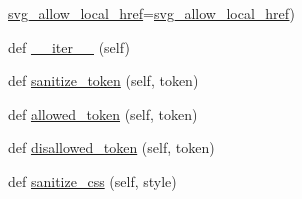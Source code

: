 \begin{DoxyCompactItemize}
\hyperlink{classpip_1_1__vendor_1_1html5lib_1_1filters_1_1sanitizer_1_1Filter_a6eb108defa9bd58d65167a6cf3edf502}{svg\+\_\+allow\+\_\+local\+\_\+href}=\hyperlink{classpip_1_1__vendor_1_1html5lib_1_1filters_1_1sanitizer_1_1Filter_a6eb108defa9bd58d65167a6cf3edf502}{svg\+\_\+allow\+\_\+local\+\_\+href})
\item 
def \hyperlink{classpip_1_1__vendor_1_1html5lib_1_1filters_1_1sanitizer_1_1Filter_a2c0ff9addc9b4172b0de3226dbeb8d71}{\+\_\+\+\_\+iter\+\_\+\+\_\+} (self)
\item 
def \hyperlink{classpip_1_1__vendor_1_1html5lib_1_1filters_1_1sanitizer_1_1Filter_a1a41f0a9620da0e675829d7beb0de620}{sanitize\+\_\+token} (self, token)
\item 
def \hyperlink{classpip_1_1__vendor_1_1html5lib_1_1filters_1_1sanitizer_1_1Filter_a0f06ab91d8402ca9f921020cffebc191}{allowed\+\_\+token} (self, token)
\item 
def \hyperlink{classpip_1_1__vendor_1_1html5lib_1_1filters_1_1sanitizer_1_1Filter_afc4f989311691eb2358c86961cb972b8}{disallowed\+\_\+token} (self, token)
\item 
def \hyperlink{classpip_1_1__vendor_1_1html5lib_1_1filters_1_1sanitizer_1_1Filter_add8dd8d642af8ce72eb11de53a362e2d}{sanitize\+\_\+css} (self, style)
\end{DoxyCompactItemize}
